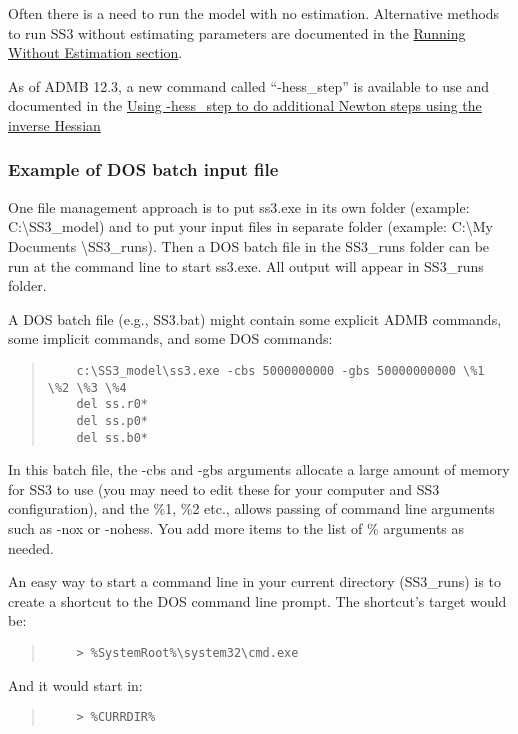 Often there is a need to run the model with no estimation. Alternative methods to run SS3 without estimating parameters are documented in the \hyperlink{NoEst}{Running Without Estimation section}. 

As of ADMB 12.3, a new command called ``-hess\_step'' is available to use and documented in the \hyperlink{hess-step}{Using -hess\_step to do additional Newton steps using the inverse Hessian}

\subsubsection{Example of DOS batch input file}
One file management approach is to put ss3.exe in its own folder (example:  C:\textbackslash SS3\_model) and to put your input files in separate folder (example:  C:\textbackslash My Documents \textbackslash SS3\_runs). Then a DOS batch file in the SS3\_runs folder can be run at the command line to start ss3.exe.  All output will appear in SS3\_runs folder.

A DOS batch file (e.g., SS3.bat) might contain some explicit ADMB commands, some implicit commands, and some DOS commands:

\begin{quote}
	\begin{verbatim}
	c:\SS3_model\ss3.exe -cbs 5000000000 -gbs 50000000000 \%1 \%2 \%3 \%4 
	del ss.r0*
	del ss.p0*
	del ss.b0*
	\end{verbatim}
\end{quote}


In this batch file, the -cbs and -gbs arguments allocate a large amount of memory for SS3 to use (you may need to edit these for your computer and SS3 configuration), and the \%1, \%2 etc., allows passing of command line arguments such as -nox or -nohess.  You add more items to the list of \% arguments as needed.

An easy way to start a command line in your current directory (SS3\_runs) is to create a shortcut to the DOS command line prompt. The shortcut's target would be:

\begin{quote}
	\begin{verbatim}
	> %SystemRoot%\system32\cmd.exe
	\end{verbatim}
\end{quote}


\noindent And it would start in:
\begin{quote}
	\begin{verbatim}
	> %CURRDIR%
	\end{verbatim}
\end{quote}

